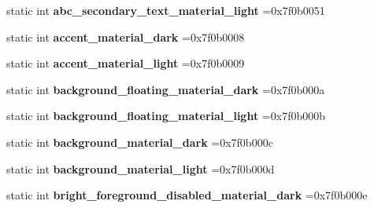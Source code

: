 \begin{DoxyCompactItemize}
static int {\bfseries abc\+\_\+secondary\+\_\+text\+\_\+material\+\_\+light} =0x7f0b0051
\item 
\mbox{\label{classandroid_1_1support_1_1v7_1_1cardview_1_1R_1_1color_add1d80d9c7f29e759a3bd2cf24ffe982}} 
static int {\bfseries accent\+\_\+material\+\_\+dark} =0x7f0b0008
\item 
\mbox{\label{classandroid_1_1support_1_1v7_1_1cardview_1_1R_1_1color_a77b5d07471b767fbdc0bb8e2497128de}} 
static int {\bfseries accent\+\_\+material\+\_\+light} =0x7f0b0009
\item 
\mbox{\label{classandroid_1_1support_1_1v7_1_1cardview_1_1R_1_1color_a699db43aa7e4a5ecd917b775a36b7fb1}} 
static int {\bfseries background\+\_\+floating\+\_\+material\+\_\+dark} =0x7f0b000a
\item 
\mbox{\label{classandroid_1_1support_1_1v7_1_1cardview_1_1R_1_1color_a384e5c46ab56ef9b1f98f98f5c4b0638}} 
static int {\bfseries background\+\_\+floating\+\_\+material\+\_\+light} =0x7f0b000b
\item 
\mbox{\label{classandroid_1_1support_1_1v7_1_1cardview_1_1R_1_1color_af5171a9105d53386174022a7acab72a2}} 
static int {\bfseries background\+\_\+material\+\_\+dark} =0x7f0b000c
\item 
\mbox{\label{classandroid_1_1support_1_1v7_1_1cardview_1_1R_1_1color_a5fa525a9821172c4ec19e1c2c96cbe64}} 
static int {\bfseries background\+\_\+material\+\_\+light} =0x7f0b000d
\item 
\mbox{\label{classandroid_1_1support_1_1v7_1_1cardview_1_1R_1_1color_a14637049c1dc92f996da223b336942ef}} 
static int {\bfseries bright\+\_\+foreground\+\_\+disabled\+\_\+material\+\_\+dark} =0x7f0b000e
\item 
\mbox{\label{classandroid_1_1support_1_1v7_1_1cardview_1_1R_1_1color_aab410ddbe236c9efc1eebbc0bc1e4c1b}} 

\end{DoxyCompactItemize}

